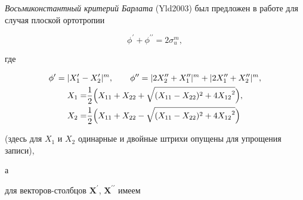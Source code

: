 {\it Восьмиконстантный критерий Барлата} ({\small\sc Yld2003})  был предложен в работе \cite{keller:bib:barlat2003} для случая плоской ортотропии 

\begin{equation}\label{keller:eq:67}

\phi^{\prime}+\phi^{\prime\prime}=2\sigma_u^m,

\end{equation} 

где

\begin{gather}\label{keller:eq:68}

\phi^{\prime}=|X_1^{\prime}-X_2^{\prime}|^m,\qquad \phi^{\prime\prime}=|2X_2^{\prime\prime}+X_1^{\prime\prime}|^m+|2X_1^{\prime\prime}+X_2^{\prime\prime}|^m,

\\

\begin{split}

	X_1= & \frac{1}{2}\Bigl(X_{11}+X_{22}+\sqrt{(X_{11}-X_{22})^2+4 {X_{12}}^{2}}\Bigr),\\

	X_2= & \frac{1}{2}\Bigl(X_{11}+X_{22}-\sqrt{(X_{11}-X_{22})^2+4{X_{12}}^{2}}\Bigr) 

\end{split}

\end{gather}

(здесь для $X_1$ и $X_2$ одинарные и двойные штрихи опущены для упрощения записи),

а 

для векторов-столбцов $\boldsymbol{X}^{\prime}$, $\boldsymbol{X}^{\prime\prime}$ имеем

